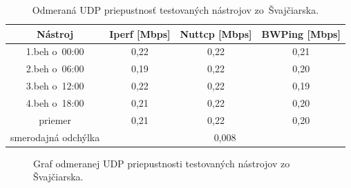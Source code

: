     \begin{table}[h!]
        \begin{center}
            \begin{tabular}{|c|c|c|c|}
                \hline
                Nástroj & Iperf [Mbps]&
                    Nuttcp [Mbps] & BWPing [Mbps] \\ 
                \hline
                1.beh o~00:00 & 0,22 & 0,22 & 0,21 \\
                \hline
                2.beh o~06:00 & 0,19 & 0,22 & 0,20 \\
                \hline
                3.beh o~12:00 & 0,22 & 0,22 & 0,19 \\
                \hline
                4.beh o~18:00 & 0,21 & 0,22 & 0,20 \\
                \hline
                priemer       & 0,21 & 0,22 & 0,20 \\
                \hline
                smerodajná odchýlka & \multicolumn{3}{c|}{0,008}\\
                \hline
            \end{tabular}
            \caption{Odmeraná UDP priepustnosť testovaných nástrojov
                zo~Švajčiarska.} 
            \label{tab_test_udp_swiss}
        \end{center}
    \end{table}
   \begin{figure}[H]
       \begin{center}
               \caption{Graf odmeranej UDP priepustnosti testovaných nástrojov
               zo Švajčiarska.}
           \label{tab_test_udp_swiss_graf}
       \end{center}
   \end{figure}

